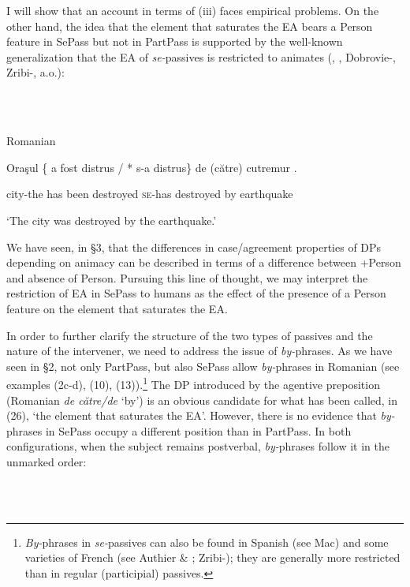 \documentclass[output=paper]{langsci/langscibook}
\begin{document}
  I will show that an account in terms of (iii) faces empirical problems. On the other hand, the idea that the element that saturates the EA bears a Person feature in SePass but not in PartPass is supported by the well-known generalization that the EA of \textit{se-}passives is restricted to animates (\citealt{Burzio1994}, \citealt{Cornilescu1998}, Dobrovie-\citealt{Sorin2017}, Zribi-\citealt{Hertz2008}, a.o.):

\ea%
    \label{ex:key:28}
    \gll\\
        \\
    \glt
    \z

          Romanian

Oraşul \{ a    fost  distrus      / * s-a      distrus\}   de (către) cutremur  .

city-the  has been destroyed    \textsc{se-}has destroyed by            earthquake

‘The city was destroyed by the earthquake.’

We have seen, in §3, that the differences in case/agreement properties of DPs depending on animacy can be described in terms of a difference between +Person and absence of Person. Pursuing this line of thought, we may interpret the restriction of EA in SePass to humans as the effect of the presence of a Person feature on the element that saturates the EA.

  In order to further clarify the structure of the two types of passives and the nature of the intervener, we need to address the issue of \textit{by-}phrases. As we have seen in §2, not only PartPass, but also SePass allow \textit{by-}phrases in Romanian (see examples (2c-d), (10), (13)).\footnote{\textit{By-}phrases in \textit{se-}passives can also be found in Spanish (see Mac\citealt{Donald2016}) and some varieties of French (see Authier \& \citealt{Reed1996}; Zribi-\citealt{Hertz2008}); they are generally more restricted than in regular (participial) passives.}  The DP introduced by the agentive preposition (Romanian \textit{de către/de} ‘by’) is an obvious candidate for what has been called, in (26), ‘the element that saturates the EA’. However, there is no evidence that \textit{by-}phrases in SePass occupy a different position than in PartPass. In both configurations, when the subject remains postverbal, \textit{by-}phrases follow it in the unmarked order: 

\ea%
    \label{ex:key:29}
    \gll\\
        \\
    \glt
    \z
\end{document}

